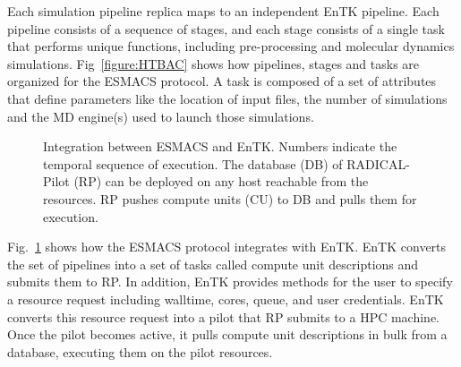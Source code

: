Each simulation pipeline replica maps to an independent EnTK pipeline. Each
pipeline consists of a sequence of stages, and each stage consists of a single
task that performs unique functions, including pre-processing and molecular
dynamics simulations. Fig~\ref{figure:HTBAC} shows how pipelines, stages and
tasks are organized for the ESMACS protocol. A task is composed of a set of
attributes that define parameters like the location of input files, the number
of simulations and the MD engine(s) used to launch those simulations.


\begin{figure}[h!]
\caption{
  Integration between ESMACS and EnTK\@. Numbers indicate
  the temporal sequence of execution. The database (DB) of RADICAL-Pilot (RP)
  can be deployed on any host reachable from the resources. RP pushes compute
  units (CU) to DB and pulls them for execution.}
  \label{figure:ht-bac_rp}
  \end{figure}




Fig.~\ref{figure:ht-bac_rp} shows how the ESMACS protocol integrates with
EnTK\@. EnTK converts the set of pipelines into a set of tasks called compute
unit descriptions and submits them to RP\@. In addition, EnTK provides
methods for the user to specify a resource request including walltime, cores,
queue, and user credentials. EnTK converts this resource request into a pilot
that RP submits to a HPC machine. Once the pilot becomes active, it pulls
compute unit descriptions in bulk from a database, executing them on the
pilot resources.





